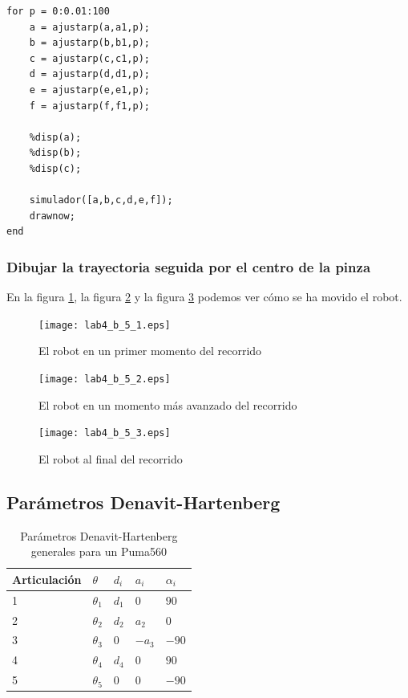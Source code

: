 \documentclass{article}
\newcommand{\fref}[1]{figura \ref{fig:#1}}
\begin{document}
\begin{lstlisting}[frame=single]
for p = 0:0.01:100
    a = ajustarp(a,a1,p);
    b = ajustarp(b,b1,p);
    c = ajustarp(c,c1,p);
    d = ajustarp(d,d1,p);
    e = ajustarp(e,e1,p);
    f = ajustarp(f,f1,p);
   
    %disp(a);
    %disp(b);
    %disp(c);
    
    simulador([a,b,c,d,e,f]);
    drawnow;
end
\end{lstlisting}

\subsubsection{Dibujar la trayectoria seguida por el centro de la pinza}

En la \fref{lab4_b_5_1}, la \fref{lab4_b_5_2} y la \fref{lab4_b_5_3} podemos ver cómo se ha movido el robot.

\begin{figure}[h]
\centering
\texttt{[image: lab4\_b\_5\_1.eps]}
\caption{El robot en un primer momento del recorrido}
\label{fig:lab4_b_5_1}
\end{figure}

\begin{figure}[h]
\centering
\texttt{[image: lab4\_b\_5\_2.eps]}
\caption{El robot en un momento más avanzado del recorrido}
\label{fig:lab4_b_5_2}
\end{figure}

\begin{figure}[h]
\centering
\texttt{[image: lab4\_b\_5\_3.eps]}
\caption{El robot al final del recorrido}
\label{fig:lab4_b_5_3}
\end{figure}

\subsection{Parámetros Denavit-Hartenberg}
\begin{table}[h]
\centering
\caption{Parámetros Denavit-Hartenberg generales para un Puma560}
\label{table:parametros_DH}
\begin{tabular}{l|llll}
Articulación & $\theta$   & $d_i$  & $a_i$   & $\alpha_i$ \\ \hline
1            & $\theta_1$ & $d_1$  & $0$     & $90$       \\
2            & $\theta_2$ & $d_2$  & $a_2$   & $0$         \\
3            & $\theta_3$ & $0$    & $-a_3$  & $-90$        \\
4            & $\theta_4$ & $d_4$  & $0$     & $90$       \\
5            & $\theta_5$ & $0$    & $0$     & $-90$       
\end{tabular}
\end{table}
\end{document}
